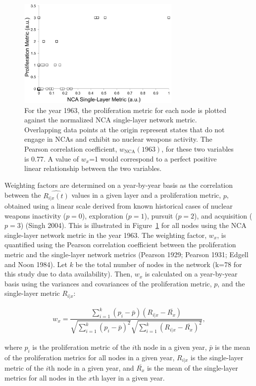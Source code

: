 \documentclass{article} %
\begin{document}
{\begin{figure}
  \centering
  \includegraphics[width=0.7\textwidth]{nca_1963.eps}
  \caption{For the year 1963, the proliferation metric for each node is plotted against the normalized NCA single-layer network metric. Overlapping data points at the origin represent states that do not engage in NCAs and exhibit no nuclear weapons activity. The Pearson correlation coefficient, $w_{\text{NCA}}(1963)$, for these two variables is 0.77. A value of $w_x$=1 would correspond to a perfect positive linear relationship between the two variables.}
  \label{fig:snap2}
\end{figure}

Weighting factors are determined on a year-by-year basis as the correlation between the $\widehat{R_{i|x}(t)}$ values in a given layer and a proliferation metric, $p$, obtained using a linear scale derived from known historical cases of nuclear weapons inactivity ($p=0$), exploration ($p=1$), pursuit ($p=2$), and acquisition ($p=3$) (Singh 2004). This is illustrated in Figure~\ref{fig:snap2} for all nodes using the NCA single-layer network metric in the year 1963. The weighting factor, $w_x$, is quantified using the Pearson correlation coefficient between the proliferation metric and the single-layer network metrics (Pearson 1929; Pearson 1931; Edgell and Noon 1984). Let $k$ be the total number of nodes in the network (k=78 for this study due to data availability). Then, $w_x$ is calculated on a year-by-year basis using the variances and covariances of the proliferation metric, $p$, and the single-layer metric $R_{i|x}$:
\begin{center}
\begin{equation}
\begin{aligned}
w_x = \dfrac { \sum_{i=1}^k(p_i - \bar{p})(R_{i|x} - \overline{R_{x}})} {\sqrt{\sum_{i=1}^k(p_i - \bar{p})^{2}}  \sqrt{\sum_{i=1}^k(R_{i|x} - \overline{R_{x}})^{2}}},
\end{aligned}
\end{equation}
\end{center}
where $p_i$ is the proliferation metric of the $i$th node in a given year, $\bar{p}$ is the mean of the proliferation metrics for all nodes in a given year, $R_{i|x}$ is the single-layer metric of the $i$th node in a given year, and $\overline{R_{x}}$ is the mean of the single-layer metrics for all nodes in the $x$th layer in a given year. 

}
\end{document}
